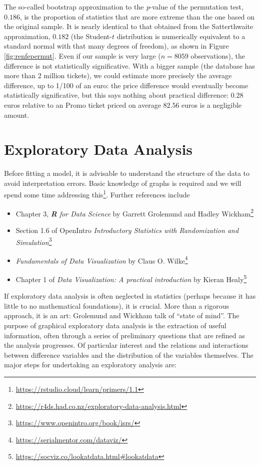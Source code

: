 \documentclass[
  11pt,
  letterpaper,
]{book}
\providecommand{\tightlist}{%
  \setlength{\itemsep}{0pt}\setlength{\parskip}{0pt}}
\renewcommand{\href}[2]{#2\footnote{\url{#1}}}
\theoremstyle{definition}
\theoremstyle{definition}
\theoremstyle{definition}
\theoremstyle{remark}
\begin{document}
The so-called bootstrap approximation to the \emph{p}-value of the permutation test, \(0.186\), is the proportion of statistics that are more extreme than the one based on the original sample. It is nearly identical to that obtained from the Satterthwaite approximation, \(0.182\) (the Student-\(t\) distribution is numerically equivalent to a standard normal with that many degrees of freedom), as shown in Figure \ref{fig:renfepermut}. Even if our sample is very large (\(n=8059\) observations), the difference is not statistically significative. With a bigger sample (the database has more than 2 million tickets), we could estimate more precisely the average difference, up to 1/100 of an euro: the price difference would eventually become statistically significative, but this says nothing about practical difference: \(0.28\) euros relative to an Promo ticket priced on average \(82.56\) euros is a negligible amount.

\hypertarget{eda}{%
\section{Exploratory Data Analysis}\label{eda}}

Before fitting a model, it is advisable to understand the structure of the data to avoid interpretation errors. Basic knowledge of graphs is required and we will spend some time \href{https://rstudio.cloud/learn/primers/1.1}{addressing this}. Further references include

\begin{itemize}
\tightlist
\item
  \href{https://r4ds.had.co.nz/exploratory-data-analysis.html}{Chapter 3, \emph{\textbf{R} for Data Science} by Garrett Grolemund and Hadley Wickham}
\item
  \href{https://www.openintro.org/book/isrs/}{Section 1.6 of OpenIntro \emph{Introductory Statistics with Randomization and Simulation}}
\item
  \href{https://serialmentor.com/dataviz/}{\emph{Fundamentals of Data Visualization} by Claus O. Wilke}
\item
  \href{https://socviz.co/lookatdata.html\#lookatdata}{Chapter 1 of \emph{Data Visualization: A practical introduction} by Kieran Healy}
\end{itemize}

If exploratory data analysis is often neglected in statistics (perhaps because it has little to no mathematical foundations), it is crucial. More than a rigorous approach, it is an art: Grolemund and Wickham talk of ``state of mind''. The purpose of graphical exploratory data analysis is the extraction of useful information, often through a series of preliminary questions that are refined as the analysis progresses. Of particular interest and the relations and interactions between difference variables and the distribution of the variables themselves. The major steps for undertaking an exploratory analysis are:
\end{document}

